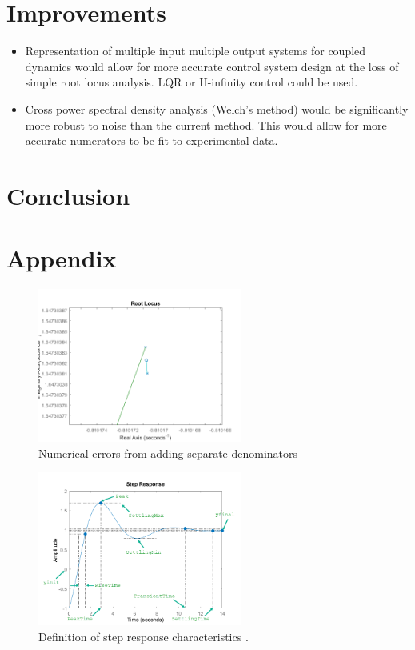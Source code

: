 \documentclass{article}
\begin{document}
\section{Improvements}

\begin{itemize}
    \item Representation of multiple input multiple output systems for coupled dynamics would allow for more accurate control system design at the loss of simple root locus analysis. LQR or H-infinity control could be used.
    \item Cross power spectral density analysis (Welch's method) would be significantly more robust to noise than the current method.
    This would allow for more accurate numerators to be fit to experimental data.
\end{itemize}


\section{Conclusion}


\section{Appendix}

\begin{figure}[H]
    \centering
    \includegraphics[width=0.6\textwidth]{figures/numerical_errors.png}
    \caption{Numerical errors from adding separate denominators}
    \label{fig:matlab_numerical_errors}
\end{figure}

\begin{figure}[H]
    \centering
    \includegraphics[width=0.6\textwidth]{figures/step-characteristics.png}
    \caption{Definition of step response characteristics \cite{matlab}.}
    \label{fig:matlab_step_chics}
\end{figure}
\end{document}
